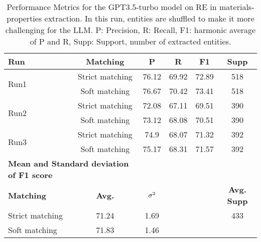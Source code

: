 \begin{table}[htbp]
    \small
    \centering
    \caption{Performance Metrics for the GPT3.5-turbo model on RE in materials-properties extraction. In this run, entities are shuffled to make it more challenging for the LLM. P: Precision, R: Recall, F1: harmonic average of P and R, Supp: Support, number of extracted entities.}
    \begin{tabular}{lccccc}
        \toprule
        \textbf{Run} & \textbf{Matching} & \textbf{P} & \textbf{R} & \textbf{F1} & \textbf{Supp} \\
        \midrule
        \multirow{2}{*}{Run1} & Strict matching & 76.12 & 69.92 & 72.89 & 518 \\
        & Soft matching & 76.67 & 70.42 & 73.41 & 518 \\
        \midrule
        \multirow{2}{*}{Run2} & Strict matching & 72.08 & 67.11 & 69.51 & 390 \\
        & Soft matching & 73.12 & 68.08 & 70.51 & 390 \\
        \midrule
        \multirow{2}{*}{Run3} & Strict matching & 74.9 & 68.07 & 71.32 & 392 \\
        & Soft matching & 75.17 & 68.31 & 71.57 & 392 \\
        \midrule
        \multicolumn{2}{l}{\textbf{Mean and Standard deviation of F1 score}} & & & & \\
        \midrule
        \textbf{Matching} & \textbf{Avg.} & $\sigma\textsuperscript{2}$ & & & \textbf{Avg. Supp}\\
        Strict matching & 71.24 & 1.69 & & & 433 \\
        Soft matching & 71.83 & 1.46 & & \\
        \bottomrule
    \end{tabular}
\end{table}


